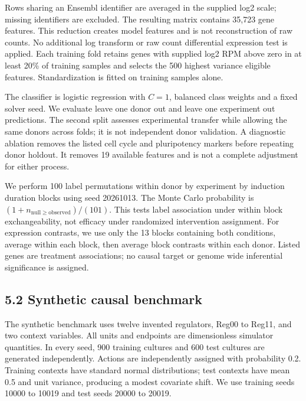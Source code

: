 \documentclass[
  11pt,
  letterpaper,
]{article}
\begin{document}
Rows sharing an Ensembl identifier are averaged in the supplied log2
scale; missing identifiers are excluded. The resulting matrix contains
35,723 gene features. This reduction creates model features and is not
reconstruction of raw counts. No additional log transform or raw count
differential expression test is applied. Each training fold retains
genes with supplied log2 RPM above zero in at least 20\% of training
samples and selects the 500 highest variance eligible features.
Standardization is fitted on training samples alone.

The classifier is logistic regression with \(C=1\), balanced class
weights and a fixed solver seed. We evaluate leave one donor out and
leave one experiment out predictions. The second split assesses
experimental transfer while allowing the same donors across folds; it is
not independent donor validation. A diagnostic ablation removes the
listed cell cycle and pluripotency markers before repeating donor
holdout. It removes 19 available features and is not a complete
adjustment for either process.

We perform 100 label permutations within donor by experiment by
induction duration blocks using seed 20261013. The Monte Carlo
probability is \((1+n_{\mathrm{null}\ge\mathrm{observed}})/(101)\). This
tests label association under within block exchangeability, not efficacy
under randomized intervention assignment. For expression contrasts, we
use only the 13 blocks containing both conditions, average within each
block, then average block contrasts within each donor. Listed genes are
treatment associations; no causal target or genome wide inferential
significance is assigned.

\hypertarget{synthetic-causal-benchmark}{%
\subsection{5.2 Synthetic causal
benchmark}\label{synthetic-causal-benchmark}}

The synthetic benchmark uses twelve invented regulators, Reg00 to Reg11,
and two context variables. All units and endpoints are dimensionless
simulator quantities. In every seed, 900 training cultures and 600 test
cultures are generated independently. Actions are independently assigned
with probability 0.2. Training contexts have standard normal
distributions; test contexts have mean 0.5 and unit variance, producing
a modest covariate shift. We use training seeds 10000 to 10019 and test
seeds 20000 to 20019.
\end{document}
